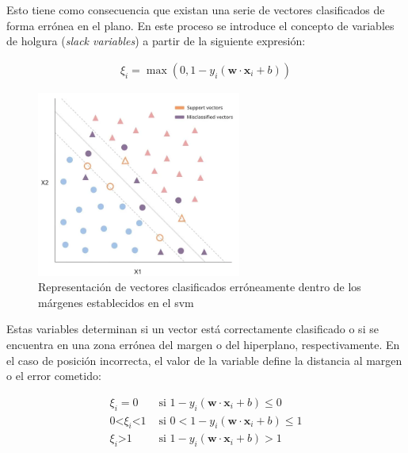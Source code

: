 \vspace{3mm}

Esto tiene como consecuencia que existan una serie de vectores clasificados de forma errónea en el plano. En este proceso se introduce el concepto de variables de holgura (\textit{slack variables}) a partir de la siguiente expresión:

\begin{equation}
    \begin{aligned}
        \xi_i = \max(0, 1 - y_i (\mathbf{w} \cdot \mathbf{x}_i + b))
    \end{aligned}
\end{equation} 

\vspace{3mm}

\begin{figure}[h!]
    \centering
    \includegraphics[width=0.6\textwidth]{img/teoria/svm2.png}
    \caption{Representación de vectores clasificados erróneamente dentro de los márgenes establecidos en el \acrshort{svm} \cite{svmmedium}}
    \label{fig:svmerror}
\end{figure}

\vspace{3mm}

Estas variables determinan si un vector está correctamente clasificado o si se encuentra en una zona errónea del margen o del hiperplano, respectivamente. En el caso de posición incorrecta, el valor de la variable define la distancia al margen o el error cometido:

\begin{equation}
    \begin{aligned}
        \xi_i = 0 & \text{ si } 1 - y_i (\mathbf{w} \cdot \mathbf{x}_i + b) \leq 0 \\
        0 \text{<} \xi_i \text{<} 1 & \text{ si } 0 < 1 - y_i (\mathbf{w} \cdot \mathbf{x}_i + b) \leq 1 \\
        \xi_i \text{>} 1 & \text{ si } 1 - y_i (\mathbf{w} \cdot \mathbf{x}_i + b) > 1 \\
    \end{aligned}
\end{equation} 

